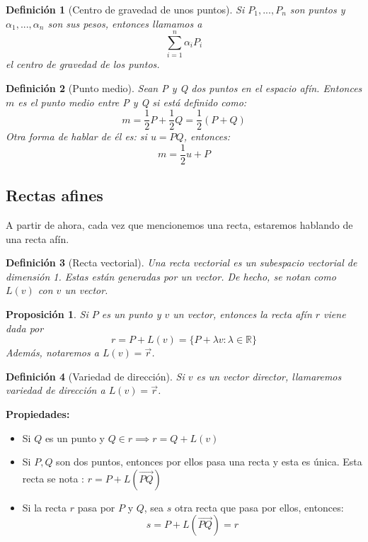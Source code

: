 \documentclass[11pt, a4paper, titlepage]{article}
\makeatletter
\renewenvironment{proof}[1][\proofname] {\vspace{-15pt}\par\pushQED{\qed}\normalfont\topsep6\p@\@plus6\p@\relax\trivlist\item[\hskip\labelsep\it#1\@addpunct{.}]\ignorespaces}{\popQED\endtrivlist\@endpefalse}
\newcommand{\R}{\mathbb{R}}
\theoremstyle{theorem-style}
\newtheorem*{nprop}{Proposición}
\theoremstyle{definition-style}
\newtheorem*{ndef}{Definición}
\theoremstyle{remark-style}
\theoremstyle{example-style}
\makeatother
\begin{document}
\begin{ndef}[Centro de gravedad de unos puntos]
	Si $P_1,...,P_n$ son puntos y $\alpha_1,...,\alpha_n$ son sus pesos, entonces llamamos a
	\[
	\sum_{i=1}^n \alpha_iP_i
	\]
	el centro de gravedad de los puntos.
\end{ndef}

\begin{ndef}[Punto medio]
Sean P y Q dos puntos en el espacio afín. Entonces $m$ es el punto medio entre P y Q si está definido como:
\[
m = \dfrac{1}{2} P + \dfrac{1}{2}Q = \dfrac{1}{2}(P+Q)
\]
Otra forma de hablar de él es: si $u = PQ$, entonces:
\[
m = \dfrac{1}{2}u + P
\]

\end{ndef}

\subsection{Rectas afines}
A partir de ahora, cada vez que mencionemos una recta, estaremos hablando de una recta afín.

\begin{ndef}[Recta vectorial]
	Una recta vectorial es un subespacio vectorial de dimensión 1. Estas están generadas por un vector. De hecho, se notan como $L(v)$ con $v$ un vector.
\end{ndef}

\begin{nprop}
	Si $P$ es un punto y $v$ un vector, entonces la recta afín $r$ viene dada por
	\[
	r = P+L(v) = \{P + \lambda v : \lambda \in \R\}
	\]
	Además, notaremos a $L(v) = \vec{r}$.
\end{nprop}
\begin{ndef}[Variedad de dirección]
	Si $v$ es un vector director, llamaremos variedad de dirección a $L(v) = \vec{r}$.
\end{ndef}

\textbf{Propiedades:}
\begin{itemize}
	\item Si $Q$ es un punto y $Q\in r \implies r = Q +L(v)$
	\item Si $P,Q$ son dos puntos, entonces por ellos pasa una recta y esta es única. Esta recta se nota : $r = P +L(\overrightarrow{PQ})$\\
	\begin{proof}
	Si la recta $r$ pasa por $P$ y $Q$, sea $s$ otra recta que pasa por ellos, entonces:
	\[
	s = P+L(\overrightarrow{PQ}) = r
	\]
\end{proof}
\end{itemize}
\end{document}
